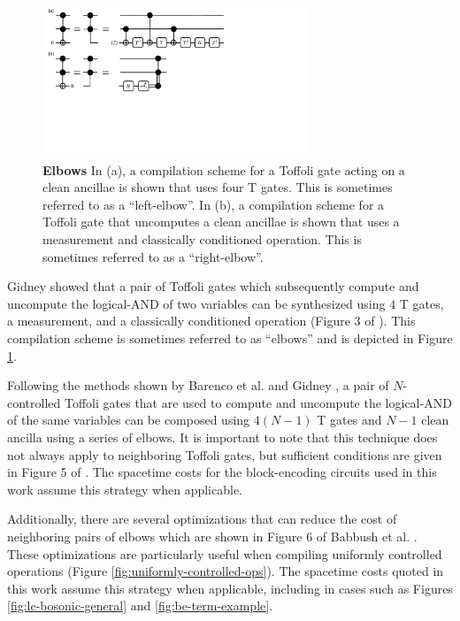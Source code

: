 \begin{figure}
    \includegraphics[width=8cm]{figures/elbows}
    \caption{
        \textbf{Elbows}
        In (a), a compilation scheme for a Toffoli gate acting on a clean ancillae is shown that uses four T gates.
        This is sometimes referred to as a ``left-elbow''.
        In (b), a compilation scheme for a Toffoli gate that uncomputes a clean ancillae is shown that uses a measurement and classically conditioned operation.
        This is sometimes referred to as a ``right-elbow''.
    }
    \label{fig:elbows}
\end{figure}

Gidney \cite{gidney2018halving} showed that a pair of Toffoli gates which subsequently compute and uncompute the logical-AND of two variables can be synthesized using $4$ T gates, a measurement, and a classically conditioned operation (Figure 3 of \cite{gidney2018halving}).
This compilation scheme is sometimes referred to as ``elbows'' and is depicted in Figure \ref{fig:elbows}.

Following the methods shown by Barenco et al. \cite{barenco1995elementary} and Gidney \cite{gidney2018halving}, a pair of $N$-controlled Toffoli gates that are used to compute and uncompute the logical-AND of the same variables can be composed using $4(N-1)$ T gates and $N-1$ clean ancilla using a series of elbows.
It is important to note that this technique does not always apply to neighboring Toffoli gates, but sufficient conditions are given in Figure 5 of \cite{gidney2018halving}.
The spacetime costs for the block-encoding circuits used in this work assume this strategy when applicable.

Additionally, there are several optimizations that can reduce the cost of neighboring pairs of elbows which are shown in Figure 6 of Babbush et al. \cite{babbush2018encoding}.
These optimizations are particularly useful when compiling uniformly controlled operations (Figure \ref{fig:uniformly-controlled-ops}).
The spacetime costs quoted in this work assume this strategy when applicable, including in cases such as Figures \ref{fig:lc-bosonic-general} and \ref{fig:be-term-example}.



